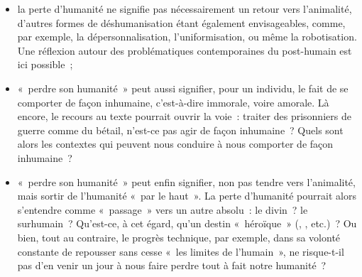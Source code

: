 {\begin{itemize}
\item la perte d'humanité ne signifie pas nécessairement un retour vers l'animalité,
d'autres formes de déshumanisation étant également envisageables,
comme, par exemple, la dépersonnalisation, l'uniformisation, ou même la
robotisation. Une réflexion autour des problématiques contemporaines du
post-humain est ici possible~;
\item «~perdre son humanité~» peut aussi signifier, pour un individu, le fait de se
comporter de façon inhumaine, c'est-à-dire immorale, voire amorale. Là
encore, le recours au texte pourrait ouvrir la voie~: traiter des prisonniers de
guerre comme du bétail, n'est-ce pas agir de façon inhumaine~? Quels sont alors les contextes qui peuvent nous conduire à nous comporter de façon
inhumaine~?
\item «~perdre son humanité~» peut enfin signifier, non pas tendre vers l'animalité,
mais sortir de l'humanité «~par le haut~». La perte d'humanité pourrait alors
s'entendre comme «~passage~» vers un autre absolu~: le divin~? le
surhumain~? Qu'est-ce, à cet égard, qu'un destin «~héroïque~» (,
, etc.)~? Ou bien, tout au contraire, le progrès technique, par exemple,
dans sa volonté constante de repousser sans cesse «~les limites de
l'humain~», ne risque-t-il pas d'en venir un jour à nous faire perdre tout à fait
notre humanité~?
\end{itemize}}

\vfill{~}\clearpage

